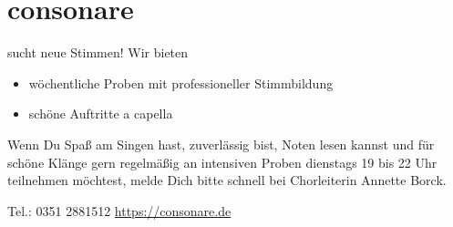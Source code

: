 \section*{consonare}
sucht neue Stimmen!
Wir bieten
\begin{itemize}
  \item wöchentliche Proben mit professioneller Stimmbildung
  \item schöne Auftritte a capella
\end{itemize}
Wenn Du Spaß am Singen hast, zuverlässig bist, Noten lesen kannst und für schöne Klänge gern
regelmäßig an intensiven Proben dienstags 19 bis 22 Uhr teilnehmen möchtest, melde Dich bitte
schnell bei Chorleiterin Annette Borck.
\begin{center}
  Tel.: 0351 2881512 \hfill \url{https://consonare.de}
\end{center}
%



